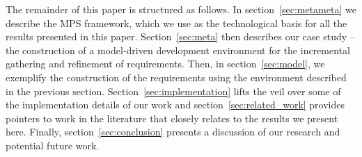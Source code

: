 The remainder of this paper is structured as follows.  In
section~\ref{sec:metameta} we describe the MPS framework, which we use as the
technological basis for all the results presented in this paper.
Section~\ref{sec:meta} then describes our case study -- the construction of a
model-driven development environment for the incremental gathering and
refinement of requirements. Then, in section~\ref{sec:model}, we exemplify the
construction of the requirements using the environment described in the previous
section. Section~\ref{sec:implementation} lifts the veil over some of the
implementation details of our work and section~\ref{sec:related_work} provides
pointers to work in the literature that closely relates to the results we
present here. Finally, section~\ref{sec:conclusion} presents a discussion of
our research and potential future work.

